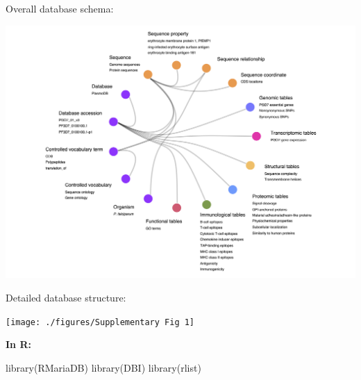 \documentclass[
  11pt,
  oneside]{book}
\newenvironment{Shaded}{\begin{snugshade}}{\end{snugshade}}
\newcommand{\FunctionTok}[1]{\textcolor[rgb]{0.00,0.00,0.00}{#1}}
\newcommand{\NormalTok}[1]{#1}
\begin{document}
Overall database schema:

\begin{center}\includegraphics[width=1\linewidth]{./figures/Fig 1} \end{center}

Detailed database structure:

\begin{center}\texttt{[image: ./figures/Supplementary Fig 1]} \end{center}

\textbf{In R: }

\begin{Shaded}
\begin{Highlighting}[]
\FunctionTok{library}\NormalTok{(RMariaDB)}
\FunctionTok{library}\NormalTok{(DBI)}
\FunctionTok{library}\NormalTok{(rlist)}
\end{Highlighting}
\end{Shaded}
\end{document}
